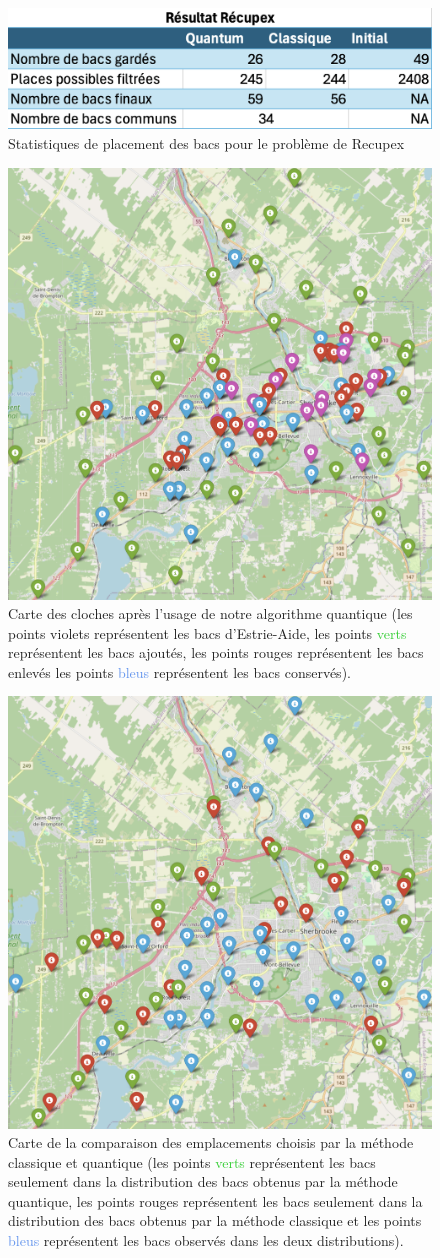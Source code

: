 \documentclass[11pt]{article}
\begin{document}
\begin{figure}[H]
    \centering
    \includegraphics[width=0.49\linewidth]{images/recupex_solver.png}
    \caption{Statistiques de placement des bacs pour le problème de Recupex}
    \label{recupex_stats}
\end{figure}


\begin{figure}[H]
    \centering
    \includegraphics[width=0.49\linewidth]{images/total_quantum.png}
    \caption{Carte des cloches après l'usage de notre algorithme quantique (les points \textcolor{Mulberry}{violets} représentent les bacs d'Estrie-Aide, les points \textcolor{LimeGreen}{verts} représentent les bacs ajoutés, les points \textcolor{BrickRed}{rouges} représentent les bacs enlevés les points \textcolor{CornflowerBlue}{bleus} représentent les bacs conservés).
}
    \label{total}
\end{figure}

\begin{figure}[H]
    \centering
    \includegraphics[width=0.49\linewidth]{images/both_distributions.png}
    \caption{Carte de la comparaison des emplacements choisis par la méthode classique et quantique (les points \textcolor{LimeGreen}{verts} représentent les bacs seulement dans la distribution des bacs obtenus par la méthode quantique, les points \textcolor{BrickRed}{rouges} représentent les bacs seulement dans la distribution des bacs obtenus par la méthode classique et les points \textcolor{CornflowerBlue}{bleus} représentent les bacs observés dans les deux distributions).
}
    \label{bothdist}
\end{figure}
\end{document}
